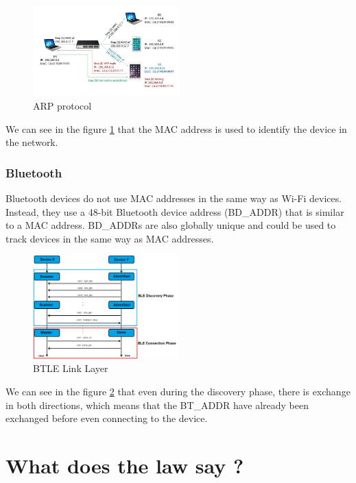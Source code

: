 \documentclass{article}
\begin{document}
  \begin{figure}[H]
      \centering
      \includegraphics[width=0.5\textwidth]{pictures/arp.jpg}
      \caption{ARP protocol \cite{ARP}}
      \label{fig:ARP}
  \end{figure}
  We can see in the figure \ref{fig:ARP} that the MAC address is used to identify the device in the network.



    \subsubsection{\label{subsec:Bluetooth}Bluetooth}
    Bluetooth devices do not use MAC addresses in the same way as Wi-Fi devices.
    Instead, they use a 48-bit Bluetooth device address (BD\_ADDR) that is similar to a MAC address.
    BD\_ADDRs are also globally unique and could be used to track devices in the same way as MAC addresses.
    \begin{figure}[H]
        \centering
        \includegraphics[width=0.5\textwidth]{pictures/Link-Layer-Roles-Change_ver1.png}
        \caption{BTLE Link Layer \cite{BLE5}}
        \label{fig:BT}
    \end{figure}
    We can see in the figure \ref{fig:BT} that even during the discovery phase, there
    is exchange in both directions, which means that the BT\_ADDR have already been 
    exchanged before even connecting to the device.


\section{\label{sec:Law}What does the law say ?}
\end{document}
